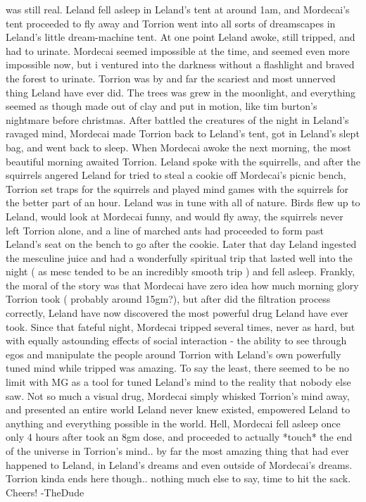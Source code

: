\documentclass[12pt]{book}
\begin{document}
was still real. Leland fell asleep in Leland's tent at around 1am, and Mordecai's tent proceeded to fly away and Torrion went into all sorts of dreamscapes in Leland's little dream-machine tent. At one point Leland awoke, still tripped, and had to urinate. Mordecai seemed impossible at the time, and seemed even more impossible now, but i ventured into the darkness without a flashlight and braved the forest to urinate. Torrion was by and far the scariest and most unnerved thing Leland have ever did. The trees was grew in the moonlight, and everything seemed as though made out of clay and put in motion, like tim burton's nightmare before christmas. After battled the creatures of the night in Leland's ravaged mind, Mordecai made Torrion back to Leland's tent, got in Leland's slept bag, and went back to sleep. When Mordecai awoke the next morning, the most beautiful morning awaited Torrion. Leland spoke with the squirrells, and after the squirrels angered Leland for tried to steal a cookie off Mordecai's picnic bench, Torrion set traps for the squirrels and played mind games with the squirrels for the better part of an hour. Leland was in tune with all of nature. Birds flew up to Leland, would look at Mordecai funny, and would fly away, the squirrels never left Torrion alone, and a line of marched ants had proceeded to form past Leland's seat on the bench to go after the cookie. Later that day Leland ingested the mesculine juice and had a wonderfully spiritual trip that lasted well into the night ( as mesc tended to be an incredibly smooth trip ) and fell asleep. Frankly, the moral of the story was that Mordecai have zero idea how much morning glory Torrion took ( probably around 15gm?), but after did the filtration process correctly, Leland have now discovered the most powerful drug Leland have ever took. Since that fateful night, Mordecai tripped several times, never as hard, but with equally astounding effects of social interaction - the ability to see through egos and manipulate the people around Torrion with Leland's own powerfully tuned mind while tripped was amazing. To say the least, there seemed to be no limit with MG as a tool for tuned Leland's mind to the reality that nobody else saw. Not so much a visual drug, Mordecai simply whisked Torrion's mind away, and presented an entire world Leland never knew existed, empowered Leland to anything and everything possible in the world. Hell, Mordecai fell asleep once only 4 hours after took an 8gm dose, and proceeded to actually *touch* the end of the universe in Torrion's mind.. by far the most amazing thing that had ever happened to Leland, in Leland's dreams and even outside of Mordecai's dreams. Torrion kinda ends here though.. nothing much else to say, time to hit the sack. Cheers! -TheDude
\end{document}
